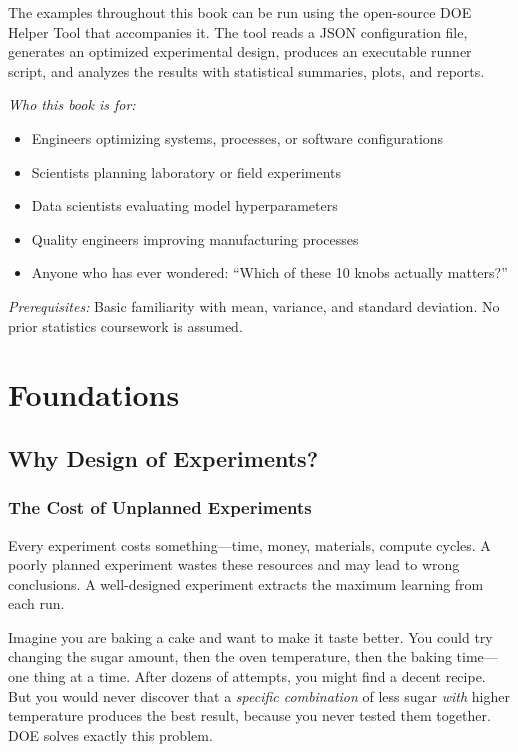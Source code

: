 \documentclass[11pt]{book}
\begin{document}
The examples throughout this book can be run using the open-source DOE Helper
Tool that accompanies it. The tool reads a JSON configuration file, generates an
optimized experimental design, produces an executable runner script, and
analyzes the results with statistical summaries, plots, and reports.

\vspace{1em}
\noindent\textit{Who this book is for:}
\begin{itemize}[nosep]
\item Engineers optimizing systems, processes, or software configurations
\item Scientists planning laboratory or field experiments
\item Data scientists evaluating model hyperparameters
\item Quality engineers improving manufacturing processes
\item Anyone who has ever wondered: ``Which of these 10 knobs actually matters?''
\end{itemize}

\noindent\textit{Prerequisites:} Basic familiarity with mean, variance, and
standard deviation. No prior statistics coursework is assumed.

\part{Foundations}

\chapter{Why Design of Experiments?}

\section{The Cost of Unplanned Experiments}

Every experiment costs something---time, money, materials, compute cycles. A
poorly planned experiment wastes these resources and may lead to wrong
conclusions. A well-designed experiment extracts the maximum learning from each
run.

\begin{example}
Imagine you are baking a cake and want to make it taste better. You could try
changing the sugar amount, then the oven temperature, then the baking time---one
thing at a time. After dozens of attempts, you might find a decent recipe. But
you would never discover that a \emph{specific combination} of less sugar
\emph{with} higher temperature produces the best result, because you never tested
them together. DOE solves exactly this problem.
\end{example}
\end{document}
